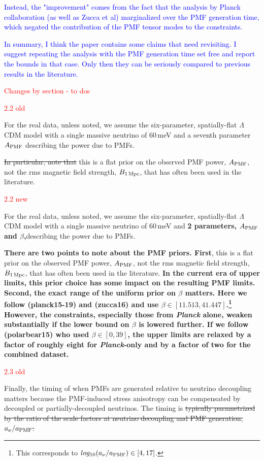 \documentclass{article}
\newcommand{\apmf}{\ensuremath{A_{\rm PMF}}}
\newcommand{\bpmf}{\ensuremath{B_{\rm 1\,Mpc}}}
\newcommand{\lcdm}{\ensuremath{\Lambda}CDM}
\newcommand{\planck}{{\sl Planck}}
\newcommand{\changed}[1]{\textcolor{Red}{#1}}
\newcommand{\removed}[1]{\st{#1}}
\newcommand{\added}[1]{\textbf{#1}}
\newcommand{\reviewer}[1]{\textcolor{Blue}{#1}}
\begin{document}
\reviewer{Instead, the "improvement" comes from the fact that the analysis by Planck collaboration (as well as Zucca et al) marginalized over the PMF generation time, which negated the contribution of the PMF tensor modes to the constraints.}

\reviewer{In summary, I think the paper contains some claims that need revisiting. I suggest repeating the analysis with the PMF generation time set free and report the bounds in that case. Only then they can be seriously compared to previous results in the literature.}



\changed{Changes by section - to dos}



\changed{2.2 old}

For the real data, unless noted, we assume the six-parameter, spatially-flat \lcdm{} model with a single massive neutrino of 60\,meV and a seventh parameter \apmf{} describing the power due to PMFs. 

\removed{In particular, note that} this is a flat prior on the observed PMF power, $\apmf$, not the rms magnetic field strength, \bpmf, that has often been used in the literature.

\changed{2.2 new}

For the real data, unless noted, we assume the six-parameter, spatially-flat \lcdm{} model with a single massive neutrino of 60\,meV and \added{2 parameters, \apmf{} and $\beta$,}describing the power due to PMFs.

\added{There are two points to note about the PMF priors. 
First}, this is a flat prior on the observed PMF power, $\apmf$, not the rms magnetic field strength, \bpmf, that has often been used in the literature. 
\added{In the current era of upper limits, this prior choice has some impact on the resulting PMF limits. 
Second, the exact range of the uniform prior on $\beta$ matters. 
Here we follow (planck15-19) and  (zucca16) and use $\beta \in [11.513, 41.447]$.\footnote{This corresponds to $log_{10} (a_{\nu}/a_{\rm{PMF}}) \in[4,17]$.}
However, the constraints, especially those from \planck{} alone, weaken substantially if the lower bound on $\beta$ is lowered further. 
If we follow (polarbear15) who used $\beta \in [0,39]$, the upper limits are relaxed by a factor of roughly eight for \planck-only and by a factor of two for the combined dataset. }

\changed{2.3 old}

Finally, the timing of when PMFs are generated relative to neutrino decoupling matters because the PMF-induced stress anisotropy can be compensated by decoupled or partially-decoupled neutrinos. 
The timing is \removed{typically parametrized by the ratio of the scale factors at neutrino decoupling and PMF generation, $a_{\nu}/a_{\rm{PMF}}$.}
\end{document}
